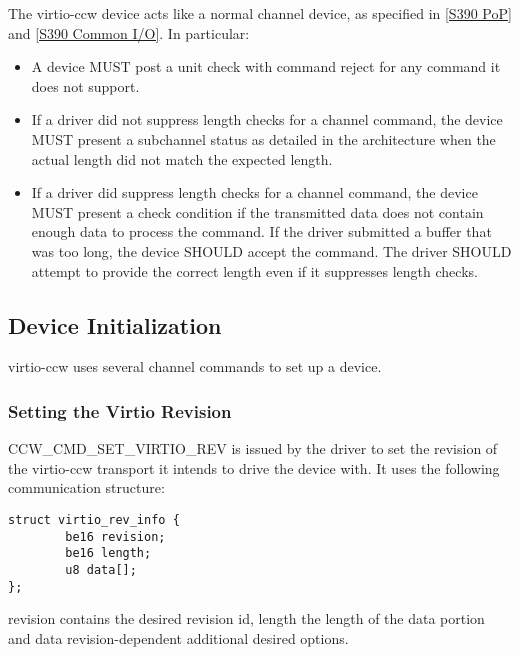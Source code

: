 The virtio-ccw device acts like a normal channel device, as specified
in \hyperref[intro:S390 PoP]{[S390 PoP]} and \hyperref[intro:S390 Common I/O]{[S390 Common I/O]}. In particular:

\begin{itemize}
\item A device MUST post a unit check with command reject for any command
  it does not support.

\item If a driver did not suppress length checks for a channel command,
  the device MUST present a subchannel status as detailed in the
  architecture when the actual length did not match the expected length.

\item If a driver did suppress length checks for a channel command, the
  device MUST present a check condition if the transmitted data does
  not contain enough data to process the command. If the driver submitted
  a buffer that was too long, the device SHOULD accept the command.
  The driver SHOULD attempt to provide the correct length even if it
  suppresses length checks.
\end{itemize}

\subsection{Device Initialization}\label{sec:Virtio Transport Options / Virtio over channel I/O / Device Initialization}

virtio-ccw uses several channel commands to set up a device.

\subsubsection{Setting the Virtio Revision}\label{sec:Virtio Transport Options / Virtio over channel I/O / Device Initialization / Setting the Virtio Revision}

CCW_CMD_SET_VIRTIO_REV is issued by the driver to set the revision of
the virtio-ccw transport it intends to drive the device with. It uses the
following communication structure:

\begin{lstlisting}
struct virtio_rev_info {
        be16 revision;
        be16 length;
        u8 data[];
};
\end{lstlisting}

revision contains the desired revision id, length the length of the
data portion and data revision-dependent additional desired options.

